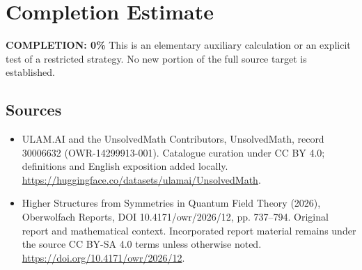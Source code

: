 \documentclass[11pt]{article}
\begin{document}
\section{Completion Estimate}
\noindent\textbf{COMPLETION: 0\%}
This is an elementary auxiliary calculation or an explicit test of a restricted strategy. No new portion of the full source target is established.

\subsection{Sources}
\begin{itemize}
\item[\hypertarget{source:30006632:1}{S1}] ULAM.AI and the UnsolvedMath Contributors, UnsolvedMath, record 30006632 (OWR-14299913-001). Catalogue curation under CC BY 4.0; definitions and English exposition added locally.
\url{https://huggingface.co/datasets/ulamai/UnsolvedMath}.
\item[\hypertarget{source:30006632:2}{S2}] Higher Structures from Symmetries in Quantum Field Theory (2026), Oberwolfach Reports, DOI 10.4171/owr/2026/12, pp. 737--794. Original report and mathematical context. Incorporated report material remains under the source CC BY-SA 4.0 terms unless otherwise noted.
\url{https://doi.org/10.4171/owr/2026/12}.
\end{itemize}
\label{end:30006632}
\end{document}
